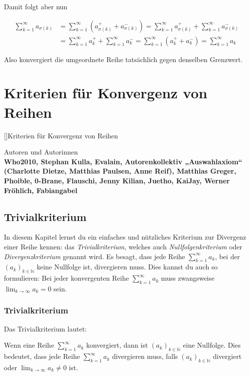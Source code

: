 \documentclass[fontsize=9pt,
               parskip=half-,
               DIV=14,
               listof=chapterentry,
               tocflat]{scrbook}
\newenvironment{authors}{\par\vspace*{\fill}\color{white}Autoren und
Autorinnen\\\bfseries}{\clearpage}
\begin{document}
Damit folgt aber nun

\begin{align*}
\sum _{k=1}^{\infty }a_{\sigma (k)}&=\sum _{k=1}^{\infty }(a_{\sigma (k)}^{+}+a_{\sigma (k)}^{-})=\sum _{k=1}^{\infty }a_{\sigma (k)}^{+}+\sum _{k=1}^{\infty }a_{\sigma (k)}^{-}\\[0.3em]&=\sum _{k=1}^{\infty }a_{k}^{+}+\sum _{k=1}^{\infty }a_{k}^{-}=\sum _{k=1}^{\infty }(a_{k}^{+}+a_{k}^{-})=\sum _{k=1}^{\infty }a_{k}
\end{align*}

Also konvergiert die umgeordnete Reihe tatsächlich gegen denselben Grenzwert.

\part{Kriterien für Konvergenz von Reihen}

[]{Kriterien für Konvergenz von Reihen}\begin{authors}
Who2010, Stephan Kulla, Evalain, Autorenkollektiv „Auswahlaxiom“ (Charlotte Dietze, Matthias Paulsen, Anne Reif), Matthias Greger, Phoible, 0-Brane, Flauschi, Jenny Kilian, Juetho, KaiJay, Werner Fröhlich, Fabiangabel\end{authors}

\chapter{Trivialkriterium}

In diesem Kapitel lernst du ein einfaches und nützliches Kriterium zur Divergenz einer Reihe kennen: das \emph{Trivialkriterium}, welches auch \emph{Nullfolgenkriterium} oder \emph{Divergenzkriterium} genannt wird. Es besagt, dass jede Reihe $\sum _{k=1}^{\infty }a_{k}$, bei der $(a_{k})_{k\in \mathbb {N} }$ keine Nullfolge ist, divergieren muss. Dies kannst du auch so formulieren: Bei jeder konvergenten Reihe $\sum _{k=1}^{\infty }a_{k}$ muss zwangsweise $\lim _{k\to \infty }a_{k}=0$ sein.

\section{Trivialkriterium}

Das Trivialkriterium lautet:

\begin{theorem*}[Trivialkriterium]
Wenn eine Reihe $\sum _{k=1}^{\infty }a_{k}$ konvergiert, dann ist $(a_{k})_{k\in \mathbb {N} }$ eine Nullfolge. Dies bedeutet, dass jede Reihe $\sum _{k=1}^{\infty }a_{k}$ divergieren muss, falls $(a_{k})_{k\in \mathbb {N} }$ divergiert oder $\lim _{k\to \infty }a_{k}\neq 0$ ist.

\end{theorem*}
\end{document}
